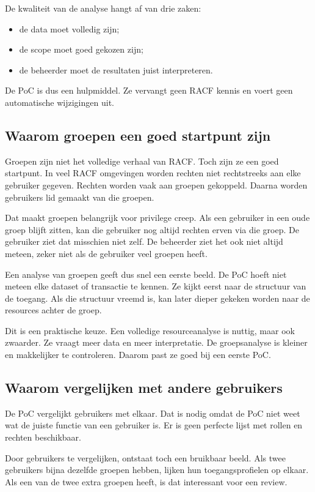 De kwaliteit van de analyse hangt af van drie zaken:

\begin{itemize}
	\item de data moet volledig zijn;
	\item de scope moet goed gekozen zijn;
	\item de beheerder moet de resultaten juist interpreteren.
\end{itemize}

De PoC is dus een hulpmiddel. Ze vervangt geen RACF kennis en voert geen automatische wijzigingen uit.

\subsection*{Waarom groepen een goed startpunt zijn}

Groepen zijn niet het volledige verhaal van RACF. Toch zijn ze een goed startpunt. In veel RACF omgevingen worden rechten niet rechtstreeks aan elke gebruiker gegeven. Rechten worden vaak aan groepen gekoppeld. Daarna worden gebruikers lid gemaakt van die groepen.

Dat maakt groepen belangrijk voor privilege creep. Als een gebruiker in een oude groep blijft zitten, kan die gebruiker nog altijd rechten erven via die groep. De gebruiker ziet dat misschien niet zelf. De beheerder ziet het ook niet altijd meteen, zeker niet als de gebruiker veel groepen heeft.

Een analyse van groepen geeft dus snel een eerste beeld. De PoC hoeft niet meteen elke dataset of transactie te kennen. Ze kijkt eerst naar de structuur van de toegang. Als die structuur vreemd is, kan later dieper gekeken worden naar de resources achter de groep.

Dit is een praktische keuze. Een volledige resourceanalyse is nuttig, maar ook zwaarder. Ze vraagt meer data en meer interpretatie. De groepsanalyse is kleiner en makkelijker te controleren. Daarom past ze goed bij een eerste PoC.

\subsection*{Waarom vergelijken met andere gebruikers}

De PoC vergelijkt gebruikers met elkaar. Dat is nodig omdat de PoC niet weet wat de juiste functie van een gebruiker is. Er is geen perfecte lijst met rollen en rechten beschikbaar.

Door gebruikers te vergelijken, ontstaat toch een bruikbaar beeld. Als twee gebruikers bijna dezelfde groepen hebben, lijken hun toegangsprofielen op elkaar. Als een van de twee extra groepen heeft, is dat interessant voor een review.


